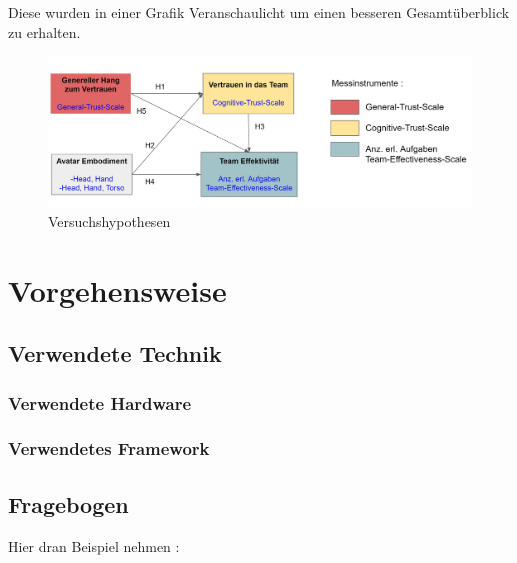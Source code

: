 \documentclass[a4paper,11pt]{article}%
\renewcommand{\\}{\vspace*{0.5\baselineskip} \newline}
\begin{document}
{Diese wurden in einer Grafik Veranschaulicht um einen besseren Gesamtüberblick zu erhalten.

\begin{figure}[H]
		\begin{footnotesize}
			\includegraphics[width=\textwidth]{Abbildungen/Versuchshypothesen.JPG}\\
			\caption{Versuchshypothesen}
			\label{Versuchshypothesen}
		\end{footnotesize}
	\end{figure}	

		
	\section{Vorgehensweise}
		\subsection{Verwendete Technik}
			\subsubsection{Verwendete Hardware}
			\subsubsection{Verwendetes Framework}
			
		\subsection{Fragebogen}
		Hier dran Beispiel nehmen :
		
}
\end{document}
